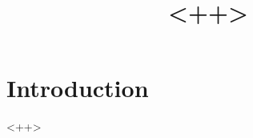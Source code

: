 \documentclass[12pt, letterpaper]{article}
\title{<++>}
\author{\authorname}
\begin{document}
\maketitle

\section{Introduction}
<++>
\end{document}
